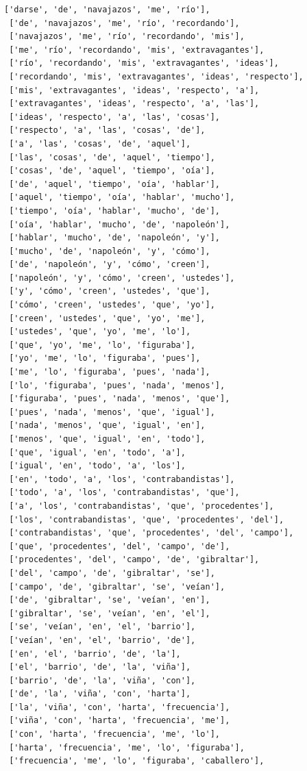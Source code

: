\documentclass[11pt]{article}
\begin{document}
\begin{tcolorbox}[breakable, size=fbox, boxrule=1pt, pad at break*=1mm,colback=cellbackground, colframe=cellborder]
\begin{Verbatim}[commandchars=\\\{\}]
 ['darse', 'de', 'navajazos', 'me', 'río'],
 ['de', 'navajazos', 'me', 'río', 'recordando'],
 ['navajazos', 'me', 'río', 'recordando', 'mis'],
 ['me', 'río', 'recordando', 'mis', 'extravagantes'],
 ['río', 'recordando', 'mis', 'extravagantes', 'ideas'],
 ['recordando', 'mis', 'extravagantes', 'ideas', 'respecto'],
 ['mis', 'extravagantes', 'ideas', 'respecto', 'a'],
 ['extravagantes', 'ideas', 'respecto', 'a', 'las'],
 ['ideas', 'respecto', 'a', 'las', 'cosas'],
 ['respecto', 'a', 'las', 'cosas', 'de'],
 ['a', 'las', 'cosas', 'de', 'aquel'],
 ['las', 'cosas', 'de', 'aquel', 'tiempo'],
 ['cosas', 'de', 'aquel', 'tiempo', 'oía'],
 ['de', 'aquel', 'tiempo', 'oía', 'hablar'],
 ['aquel', 'tiempo', 'oía', 'hablar', 'mucho'],
 ['tiempo', 'oía', 'hablar', 'mucho', 'de'],
 ['oía', 'hablar', 'mucho', 'de', 'napoleón'],
 ['hablar', 'mucho', 'de', 'napoleón', 'y'],
 ['mucho', 'de', 'napoleón', 'y', 'cómo'],
 ['de', 'napoleón', 'y', 'cómo', 'creen'],
 ['napoleón', 'y', 'cómo', 'creen', 'ustedes'],
 ['y', 'cómo', 'creen', 'ustedes', 'que'],
 ['cómo', 'creen', 'ustedes', 'que', 'yo'],
 ['creen', 'ustedes', 'que', 'yo', 'me'],
 ['ustedes', 'que', 'yo', 'me', 'lo'],
 ['que', 'yo', 'me', 'lo', 'figuraba'],
 ['yo', 'me', 'lo', 'figuraba', 'pues'],
 ['me', 'lo', 'figuraba', 'pues', 'nada'],
 ['lo', 'figuraba', 'pues', 'nada', 'menos'],
 ['figuraba', 'pues', 'nada', 'menos', 'que'],
 ['pues', 'nada', 'menos', 'que', 'igual'],
 ['nada', 'menos', 'que', 'igual', 'en'],
 ['menos', 'que', 'igual', 'en', 'todo'],
 ['que', 'igual', 'en', 'todo', 'a'],
 ['igual', 'en', 'todo', 'a', 'los'],
 ['en', 'todo', 'a', 'los', 'contrabandistas'],
 ['todo', 'a', 'los', 'contrabandistas', 'que'],
 ['a', 'los', 'contrabandistas', 'que', 'procedentes'],
 ['los', 'contrabandistas', 'que', 'procedentes', 'del'],
 ['contrabandistas', 'que', 'procedentes', 'del', 'campo'],
 ['que', 'procedentes', 'del', 'campo', 'de'],
 ['procedentes', 'del', 'campo', 'de', 'gibraltar'],
 ['del', 'campo', 'de', 'gibraltar', 'se'],
 ['campo', 'de', 'gibraltar', 'se', 'veían'],
 ['de', 'gibraltar', 'se', 'veían', 'en'],
 ['gibraltar', 'se', 'veían', 'en', 'el'],
 ['se', 'veían', 'en', 'el', 'barrio'],
 ['veían', 'en', 'el', 'barrio', 'de'],
 ['en', 'el', 'barrio', 'de', 'la'],
 ['el', 'barrio', 'de', 'la', 'viña'],
 ['barrio', 'de', 'la', 'viña', 'con'],
 ['de', 'la', 'viña', 'con', 'harta'],
 ['la', 'viña', 'con', 'harta', 'frecuencia'],
 ['viña', 'con', 'harta', 'frecuencia', 'me'],
 ['con', 'harta', 'frecuencia', 'me', 'lo'],
 ['harta', 'frecuencia', 'me', 'lo', 'figuraba'],
 ['frecuencia', 'me', 'lo', 'figuraba', 'caballero'],

\end{Verbatim}
\end{tcolorbox}
\end{document}
